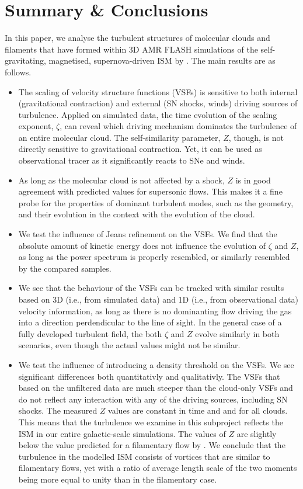 \section{Summary \& Conclusions}\label{conclusions}

In this paper, we analyse the turbulent structures of molecular clouds and filaments that have formed within 3D AMR FLASH simulations of the self-gravitating, magnetised, supernova-driven ISM by \citet{IbanezMejia2016}.
The main results are as follows.

\begin{itemize}
	\item The scaling of velocity structure functions (VSFs) is sensitive to both internal (gravitational contraction) and external (SN shocks, winds) driving sources of turbulence. Applied on simulated data, the time evolution of the scaling exponent, $\zeta$, can reveal which driving mechanism dominates the turbulence of an entire molecular cloud. The self-similarity parameter, $Z$, though, is not directly sensitive to gravitational contraction. Yet, it can be used as observational tracer as it significantly reacts to SNe and winds.
	\item As long as the molecular cloud is not affected by a shock, $Z$ is in good agreement with predicted values for supersonic flows. This makes it a fine probe for the properties of dominant turbulent modes, such as the geometry, and their evolution in the context with the evolution of the cloud. 
	\item We test the influence of Jeans refinement on the VSFs. We find that the absolute amount of kinetic energy does not influence the evolution of $\zeta$ and $Z$, as long as the power spectrum is properly resembled, or similarly resembled by the compared samples.
	\item We see that the behaviour of the VSFs can be tracked with similar results based on 3D (i.e., from simulated data) and 1D (i.e., from observational data) velocity information, as long as there is no dominanting flow driving the gas into a direction perdendicular to the line of sight. In the general case of a fully developed turbulent field, the both $\zeta$ and $Z$ evolve similarly in both scenarios, even though the actual values might not be similar.
	\item We test the influence of introducing a density threshold on the VSFs. We see significant differences both quantitativly and qualitativly. The VSFs that based on the unfiltered data are much steeper than the cloud-only VSFs and do not reflect any interaction with any of the driving sources, including SN shocks. The measured $Z$ values are constant in time and and for all clouds. This means that the turbulence we examine in this subproject reflects the ISM in our entire galactic-scale simulations. The values of $Z$ are slightly below the value predicted for a filamentary flow by \citet{She1997}. We conclude that the turbulence in the modelled ISM consists of vortices that are similar to filamentary flows, yet with a ratio of average length scale of the two moments being more equal to unity than in the filamentary case.

\end{itemize}
